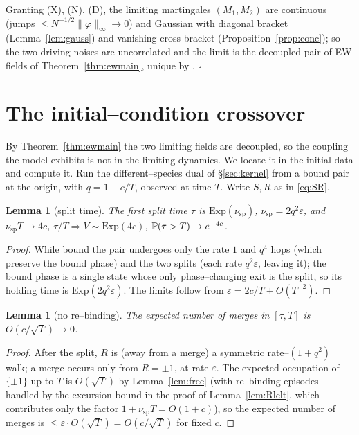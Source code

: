 \documentclass[11pt]{article}
\theoremstyle{plain}
\newtheorem{lemma}[theorem]{Lemma}
\theoremstyle{definition}
\theoremstyle{remark}
\newcommand{\To}{\Rightarrow}\newcommand{\so}{\mathfrak{so}}
\newcommand{\eps}{\varepsilon}\newcommand{\Exp}{\mathrm{Exp}}
\begin{document}
\noindent Granting (X), (N), (D), the limiting martingales $(M_1,M_2)$ are continuous
(jumps $\le N^{-1/2}\|\varphi\|_\infty\to0$) and Gaussian with diagonal bracket
(Lemma~\ref{lem:gauss}) and vanishing cross bracket (Proposition~\ref{prop:conc}); so
the two driving noises are uncorrelated and the limit is the decoupled pair of EW
fields of Theorem~\ref{thm:ewmain}, unique by \cite[Ch.~11]{KL}. \hfill$\square$

\section{The initial--condition crossover}\label{sec:cross}

By Theorem~\ref{thm:ewmain} the two limiting fields are decoupled, so the coupling the
model exhibits is not in the limiting dynamics. We locate it in the initial data and
compute it. Run the different--species dual of \S\ref{sec:kernel} from a bound pair at
the origin, with $q=1-c/T$, observed at time $T$. Write $S,R$ as in \eqref{eq:SR}.

\begin{lemma}[split time]\label{lem:split}
The first split time $\tau$ is $\Exp(\nu_{\mathrm{sp}})$, $\nu_{\mathrm{sp}}=2q^2\eps$,
and $\nu_{\mathrm{sp}}T\to4c$, $\tau/T\To V\sim\Exp(4c)$, $\mathbb{P}(\tau>T)\to e^{-4c}$.
\end{lemma}
\begin{proof}
While bound the pair undergoes only the rate $1$ and $q^4$ hops (which preserve the
bound phase) and the two splits (each rate $q^2\eps$, leaving it); the bound phase is a
single state whose only phase--changing exit is the split, so its holding time is
$\Exp(2q^2\eps)$. The limits follow from $\eps=2c/T+O(T^{-2})$.
\end{proof}

\begin{lemma}[no re--binding]\label{lem:rebind}
The expected number of merges in $[\tau,T]$ is $O(c/\sqrt T)\to0$.
\end{lemma}
\begin{proof}
After the split, $R$ is (away from a merge) a symmetric rate--$(1+q^2)$ walk; a merge
occurs only from $R=\pm1$, at rate $\eps$. The expected occupation of $\{\pm1\}$ up to
$T$ is $O(\sqrt T)$ by Lemma~\ref{lem:free} (with re--binding episodes handled by the
excursion bound in the proof of Lemma~\ref{lem:Rlclt}, which contributes only the
factor $1+\nu_{\mathrm{sp}}T=O(1+c)$), so the expected number of merges is
$\le\eps\cdot O(\sqrt T)=O(c/\sqrt T)$ for fixed $c$.
\end{proof}
\end{document}
